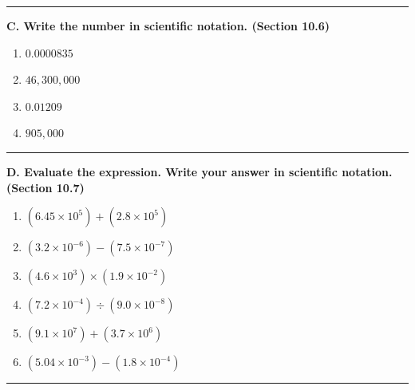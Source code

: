 \documentclass[11pt]{article}
\newcommand{\work}[1]{\vspace{#1}\par}
\begin{document}
\vspace{0.2em}\hrule\vspace{0.9em}

\textbf{C. Write the number in scientific notation. (Section 10.6)}

\begin{enumerate}[label=\arabic*., resume]
\item $0.0000835$
\work{1.1in}

\item $46,\!300,\!000$
\work{1.1in}

\item $0.01209$
\work{1.1in}

\item $905,\!000$
\work{1.1in}
\end{enumerate}

\vspace{0.2em}\hrule\vspace{0.9em}

\textbf{D. Evaluate the expression. Write your answer in scientific notation. (Section 10.7)}

\begin{enumerate}[label=\arabic*., resume]
\item $(6.45\times 10^{5}) + (2.8\times 10^{5})$
\work{1.4in}

\item $(3.2\times 10^{-6}) - (7.5\times 10^{-7})$
\work{1.4in}

\item $(4.6\times 10^{3}) \times (1.9\times 10^{-2})$
\work{1.6in}

\item $(7.2\times 10^{-4}) \div (9.0\times 10^{-8})$
\work{1.6in}

\item $(9.1\times 10^{7}) + (3.7\times 10^{6})$
\work{1.6in}

\item $(5.04\times 10^{-3}) - (1.8\times 10^{-4})$
\work{1.6in}
\end{enumerate}

\vspace{0.2em}\hrule\vspace{0.9em}
\end{document}
